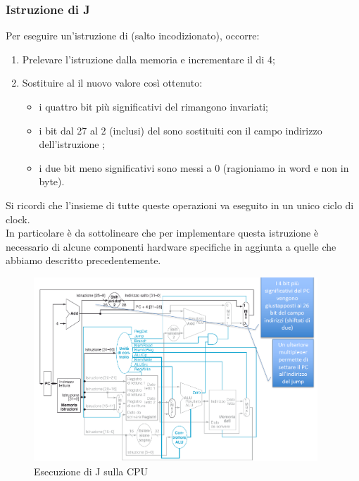\documentclass[class=book, crop=false, oneside]{standalone}
\begin{document}
\subsubsection{Istruzione di J}
Per eseguire un'istruzione di  (salto incodizionato), occorre:
\begin{enumerate}
	\item Prelevare l’istruzione dalla memoria e incrementare il  di 4;
	\item Sostituire al  il nuovo valore così ottenuto:
	\begin{itemize}
		\item i quattro bit più significativi del  rimangono invariati;
		\item i bit dal 27 al 2 (inclusi) del  sono sostituiti con il campo indirizzo dell'istruzione ;
		\item i due bit meno significativi sono messi a 0 (ragioniamo in word e non in byte).
	\end{itemize}
\end{enumerate}
Si ricordi che l'insieme di tutte queste operazioni va eseguito in un unico ciclo di clock.\\
In particolare è da sottolineare che per implementare questa istruzione è necessario di alcune componenti hardware specifiche in aggiunta a quelle che abbiamo descritto precedentemente.

\begin{figure}[H]
	\centering
	\includegraphics[width=0.95\textwidth,keepaspectratio]{es_j.png}
	\caption{Esecuzione di J sulla CPU}
\end{figure}
\end{document}
